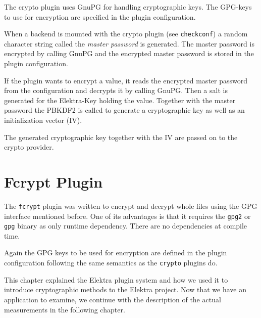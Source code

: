 The crypto plugin uses GnuPG for handling cryptographic keys. The
GPG-keys to use for encryption are specified in the plugin
configuration.

When a backend is mounted with the crypto plugin (see
\texttt{checkconf}) a random character string called the \emph{master
password} is generated. The master password is encrypted by calling
GnuPG and the encrypted master password is stored in the plugin
configuration.

If the plugin wants to encrypt a value, it reads the encrypted master
password from the configuration and decrypts it by calling GnuPG. Then a
salt is generated for the Elektra-Key holding the value. Together with
the master password the PBKDF2 is called to generate a cryptographic key
as well as an initialization vector (IV).

The generated cryptographic key together with the IV are passed on to
the crypto provider.

\section{Fcrypt Plugin}\label{fcrypt-plugin}

The \texttt{fcrypt} plugin was written to encrypt and decrypt whole
files using the GPG interface mentioned before. One of its advantages is
that it requires the \texttt{gpg2} or \texttt{gpg} binary as only
runtime dependency. There are no dependencies at compile time.

Again the GPG keys to be used for encryption are defined in the plugin
configuration following the same semantics as the \texttt{crypto}
plugins do.

This chapter explained the Elektra plugin system and how we used it to introduce cryptographic methods to the Elektra project.
Now that we have an application to examine, we continue with the description of the actual measurements in the following chapter.
